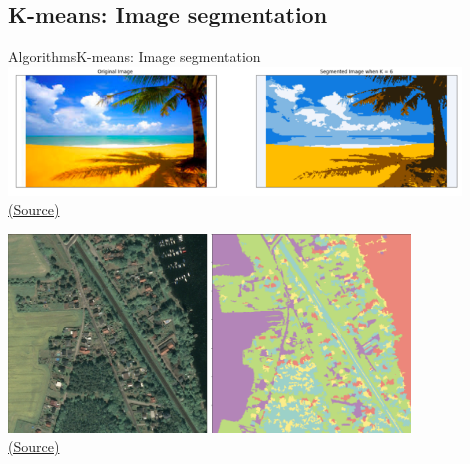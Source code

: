 \documentclass[10pt,compress]{beamer} %
\begin{document}
\subsection{K-means: Image segmentation}
\begin{frame}[plain]{Algorithms}{K-means: Image segmentation}
	\includegraphics[width=0.9\textwidth]{figs/segmentation1.png}\\
        \centering \tiny{\href{https://www.kdnuggets.com/2019/08/introduction-image-segmentation-k-means-clustering.html}{(Source)}}

    \medskip

	\includegraphics[width=0.8\textwidth]{figs/segmentation2.png}\\
        \centering \tiny{\href{https://up42.com/blog/tech/satellite-image-processing-made-simple}{(Source)}}
\end{frame}
\end{document}

